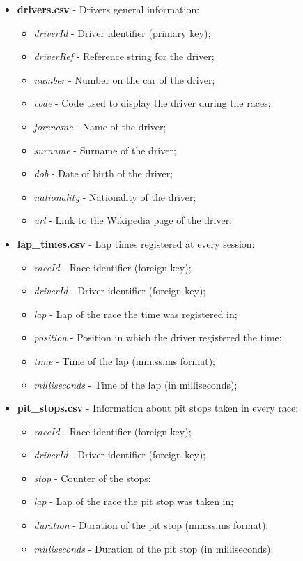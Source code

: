 \documentclass{Configuration_Files/PoliMi3i_thesis}
\begin{document}
\begin{itemize}
    \item \textbf{drivers.csv} - Drivers general information:
    \begin{itemize}
        \item \textit{driverId} - Driver identifier (primary key);
        \item \textit{driverRef} - Reference string for the driver;
        \item \textit{number} - Number on the car of the driver;
        \item \textit{code} - Code used to display the driver during the races;
        \item \textit{forename} - Name of the driver;
        \item \textit{surname} - Surname of the driver;
        \item \textit{dob} - Date of birth of the driver;
        \item \textit{nationality} - Nationality of the driver;
        \item \textit{url} - Link to the Wikipedia page of the driver;
    \end{itemize}

    \item \textbf{lap\_times.csv} - Lap times registered at every session:
    \begin{itemize}
        \item \textit{raceId} - Race identifier (foreign key);
        \item \textit{driverId} - Driver identifier (foreign key);
        \item \textit{lap} - Lap of the race the time was registered in;
        \item \textit{position} - Position in which the driver registered the time;
        \item \textit{time} - Time of the lap (mm:ss.ms format);
        \item \textit{milliseconds} - Time of the lap (in milliseconds);
    \end{itemize}

    \item \textbf{pit\_stops.csv} - Information about pit stops taken in every race:
    \begin{itemize}
        \item \textit{raceId} - Race identifier (foreign key);
        \item \textit{driverId} - Driver identifier (foreign key);
        \item \textit{stop} - Counter of the stops;
        \item \textit{lap} - Lap of the race the pit stop was taken in;
        \item \textit{duration} - Duration of the pit stop (mm:ss.ms format);
        \item \textit{milliseconds} - Duration of the pit stop (in milliseconds);
    \end{itemize}


\end{itemize}
\end{document}
